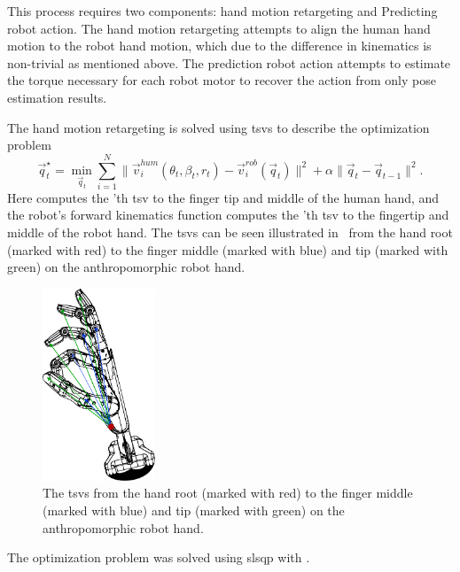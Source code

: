 This process requires two components: hand motion retargeting and Predicting
robot action. The hand motion retargeting attempts to align the human hand motion to the
robot hand motion, which due to the difference in kinematics is non-trivial as mentioned above. The prediction robot action attempts to estimate the torque necessary for each robot motor to recover the action from only pose estimation results. \medskip

The hand motion retargeting is solved using \gls{tsv}s to describe the optimization problem
\begin{equation}
    \vec{q}^\star_t = \min_{\vec{q}_t} \sum^N_{i=1}\| \vec{v}^{hum}_i(\theta_t,\beta_t,r_t)-\vec{v}^{rob}_i(\vec{q}_t)\|^2+\alpha \| \vec{q}_t - \vec{q}_{t-1} \|^2.
\end{equation}
Here  computes the 'th \gls{tsv} to the finger tip and middle of the human hand, and the robot's forward kinematics function  computes the 'th \gls{tsv} to the fingertip and middle of the robot hand. The \gls{tsv}s can be seen illustrated in~ from the hand root (marked with red) to the finger middle (marked with blue) and tip (marked with green) on the anthropomorphic robot hand.\medskip

\begin{figure}[!h]
	\begin{center}
		\includegraphics[width=0.3\textwidth]{chapters/3-in-hand-manipulation/fig/tsv.pdf}
	\end{center}
	\caption{The \gls{tsv}s from the hand root (marked with red) to the finger middle (marked with blue) and tip (marked with green) on the anthropomorphic robot hand.}
	\label{fig:tsv}
\end{figure}

The optimization problem was solved using \gls{slsqp} with .\medskip

